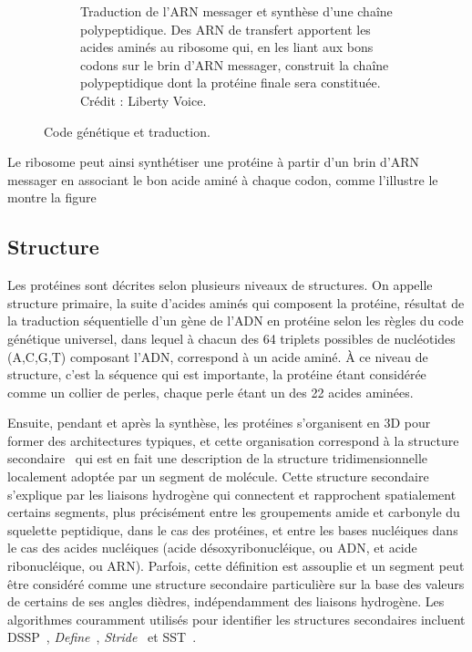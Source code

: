 \begin{appendices}
\begin{figure}[htb]
\begin{subfigure}[t]{0.54\textwidth}
			\caption[Traduction de l'ARN messager en protéine]{Traduction de l'ARN messager et synthèse d'une chaîne polypeptidique. Des ARN de transfert apportent les acides aminés au ribosome qui, en les liant aux bons codons sur le brin d'ARN messager, construit la chaîne polypeptidique dont la protéine finale sera constituée. Crédit : Liberty Voice\footnotemark{}.}
			\label{fig:translation}
		\end{subfigure}
		\label{fig:codeTrans}
		\caption{Code génétique et traduction.}
	\end{figure}
	
	\addtocounter{footnote}{-1}
	\addtocounter{footnote}{1}
	
	Le ribosome peut ainsi synthétiser une protéine à partir d'un brin d'ARN messager en associant le bon acide aminé à chaque codon, comme l'illustre le montre la figure
	
	\subsection{Structure}
	Les protéines sont décrites selon plusieurs niveaux de structures. On appelle structure primaire, la suite d'acides aminés qui composent la protéine, résultat de la traduction séquentielle d'un gène de l'ADN en protéine selon les règles du code génétique universel, dans lequel à chacun des 64 triplets possibles de nucléotides (A,C,G,T) composant l'ADN, correspond à un acide aminé. À ce niveau de structure, c'est la séquence qui est importante, la protéine étant considérée comme un collier de perles, chaque perle étant un des 22 acides aminées.
	
	Ensuite, pendant et après la synthèse, les protéines s'organisent en 3D pour former des architectures typiques, et cette organisation correspond à la structure secondaire~\cite{foltmann1981protein} qui est en fait une description de la structure tridimensionnelle localement adoptée par un segment de molécule. Cette structure secondaire s'explique par les liaisons hydrogène qui connectent et rapprochent spatialement certains segments, plus précisément entre les groupements amide et carbonyle du squelette peptidique, dans le cas des protéines, et entre les bases nucléiques dans le cas des acides nucléiques (acide désoxyribonucléique, ou ADN, et acide ribonucléique, ou ARN). Parfois, cette définition est assouplie et un segment peut être considéré comme une structure secondaire particulière sur la base des valeurs de certains de ses angles dièdres, indépendamment des liaisons hydrogène. Les algorithmes couramment utilisés pour identifier les structures secondaires incluent DSSP~\cite{kabsch1983dictionary}, \emph{Define}~\cite{richards1988identification}, \emph{Stride}~\cite{frishman1995knowledge} et SST~\cite{konagurthu2012minimum}.
		

\end{appendices}

